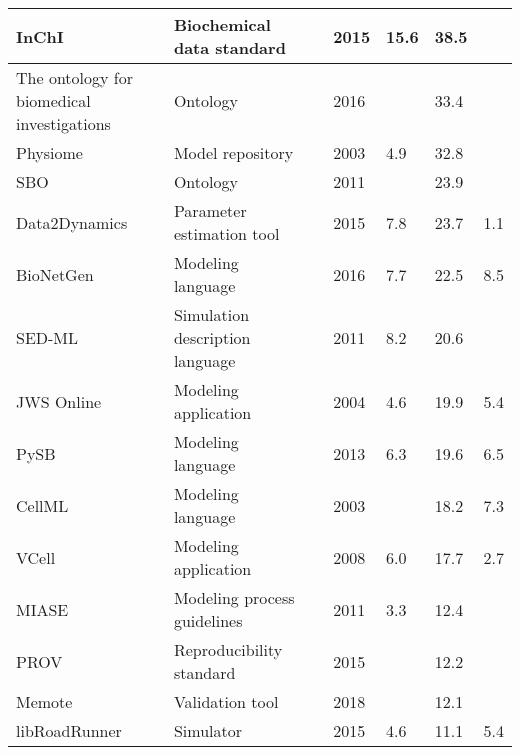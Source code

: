 \begin{longtable}{L{2.2cm}L{4cm}L{1cm}L{0.8cm}R{1.1cm}R{1cm}R{1cm}}
\midrule
\small{InChI} &\small{Biochemical data standard} &\cite{Heller2015InChIIdentifier.} &\small{2015} &\small{15.6} &\small{38.5} &\small{}\\
\midrule
\small{The ontology for biomedical investigations} &\small{Ontology} &\cite{Bandrowski2016TheInvestigations} &\small{2016} &\small{} &\small{33.4} &\small{}\\
\midrule
\small{Physiome} &\small{Model repository} &\cite{hunter2003integration} &\small{2003} &\small{4.9} &\small{32.8} &\small{}\\
\midrule
\small{SBO} &\small{Ontology} &\cite{Courtot2011ControlledBiology.} &\small{2011} &\small{} &\small{23.9} &\small{}\\
\midrule
\small{Data2Dynamics} &\small{Parameter estimation tool} &\cite{Raue2015Data2Dynamics:Systems} &\small{2015} &\small{7.8} &\small{23.7} &\small{1.1}\\
\midrule
\small{BioNetGen} &\small{Modeling language} &\cite{Harris2016BioNetGenModeling} &\small{2016} &\small{7.7} &\small{22.5} &\small{8.5}\\
\midrule
\small{SED-ML} &\small{Simulation description language} &\cite{Waltemath2011ReproducibleLanguage} &\small{2011} &\small{8.2} &\small{20.6} &\small{}\\
\midrule
\small{JWS Online} &\small{Modeling application} &\cite{Olivier2004Web-basedOnline} &\small{2004} &\small{4.6} &\small{19.9} &\small{5.4}\\
\midrule
\small{PySB} &\small{Modeling language} &\cite{Lopez2013ProgrammingPySB} &\small{2013} &\small{6.3} &\small{19.6} &\small{6.5}\\
\midrule
\small{CellML} &\small{Modeling language} &\cite{Cuellar2003AnLanguage} &\small{2003} &\small{} &\small{18.2} &\small{7.3}\\
\midrule
\small{VCell} &\small{Modeling application} &\cite{moraru2008virtual} &\small{2008} &\small{6.0} &\small{17.7} &\small{2.7}\\
\midrule
\small{MIASE} &\small{Modeling process guidelines} &\cite{Waltemath2011MinimumMIASE} &\small{2011} &\small{3.3} &\small{12.4} &\small{}\\
\midrule
\small{PROV} &\small{Reproducibility standard} &\cite{Moreau2015ThePROV} &\small{2015} &\small{} &\small{12.2} &\small{}\\
\midrule
\small{Memote} &\small{Validation tool} &\cite{Lieven2018Memote:Suite} &\small{2018} &\small{} &\small{12.1} &\small{}\\
\midrule
\small{libRoadRunner} &\small{Simulator} &\cite{Somogyi2015LibRoadRunner:Library.} &\small{2015} &\small{4.6} &\small{11.1} &\small{5.4}\\

\end{longtable}
